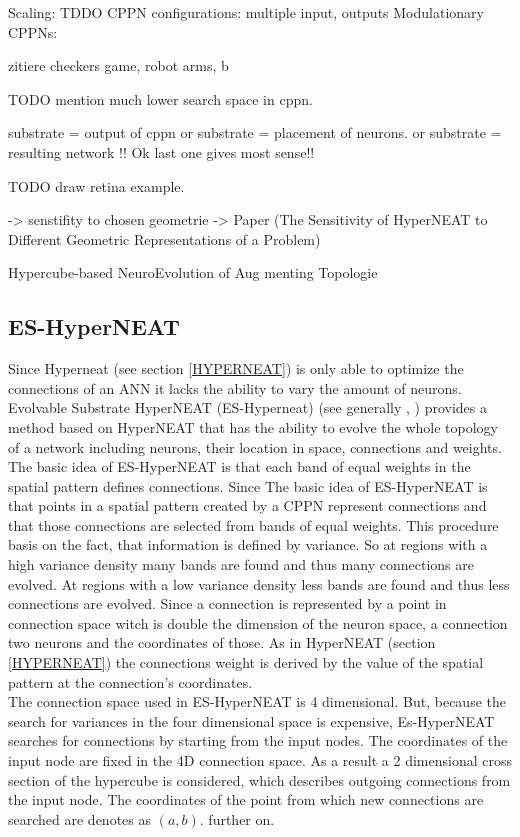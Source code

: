  Scaling: TDDO 
 CPPN configurations: multiple input, outputs
 Modulationary CPPNs:
 
 
 zitiere checkers game, robot arms, b

TODO mention much lower search space in cppn.


substrate = output of cppn
or substrate = placement of neurons.
or substrate = resulting network !!
Ok last one gives most sense!!

TODO draw retina example.

-> senstifity to chosen geometrie -> Paper (The Sensitivity of HyperNEAT to Different Geometric Representations of a Problem)

Hypercube-based NeuroEvolution of Aug
menting Topologie
\subsection{ES-HyperNEAT}\label{ES_HYPERNEAT}
Since Hyperneat (see section \ref{HYPERNEAT}) is only able to optimize the connections of an ANN it lacks the ability to vary the amount of neurons. Evolvable Substrate HyperNEAT (ES-Hyperneat) (see generally \cite{ESHyperNEATarticle}, \cite{ESHyperNEATPaper} ) provides a method based on HyperNEAT that has the ability to evolve the whole topology of a network including neurons, their location in space, connections and weights. 
The basic idea of ES-HyperNEAT is that each band of equal weights in the spatial pattern defines connections. Since 
The basic idea of ES-HyperNEAT is that points in a spatial pattern created by a CPPN represent connections and that those connections are selected from bands of equal weights. This procedure basis on the fact, that information is defined by variance. So at regions with a high variance density many bands are found and thus many connections are evolved. At regions with a low variance density less bands are found and thus less connections are evolved. Since a connection is represented by a point in connection space witch is double the dimension of the neuron space, a connection two neurons and the coordinates of those. As in HyperNEAT (section \ref{HYPERNEAT}) the connections weight is derived by the value of the spatial pattern at the connection's coordinates.\\
The connection space used in ES-HyperNEAT is 4 dimensional. But, because the search for variances in the four dimensional space is expensive, Es-HyperNEAT searches for connections by starting from the input nodes. The coordinates of the input node are fixed in the 4D connection space. As a result a 2 dimensional cross section of the hypercube is considered, which describes outgoing connections from the input node. The coordinates of the point from which new connections are searched are denotes as $(a,b)$. further on.
